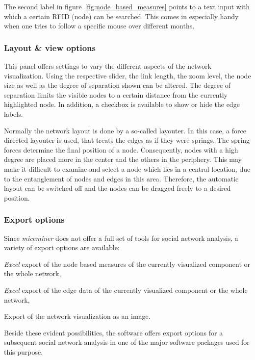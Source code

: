 The second label in figure~\ref{fig:node_based_measures} points to a text input with which a certain RFID (node) can be searched. This comes in especially handy when one tries to follow a specific mouse over different months.     

\subsubsection*{Layout \& view options}

This panel offers settings to vary the different aspects of the network visualization. Using the respective slider, the link length, the zoom level, the node size as well as the degree of separation shown can be altered. The degree of separation limits the visible nodes to a certain distance from the currently highlighted node. In addition, a checkbox is available to show or hide the edge labels.

Normally the network layout is done by a so-called layouter. In this case, a force directed layouter is used, that treats the edges as if they were springs. The spring forces determine the final position of a node. Consequently, nodes with a high degree are placed more in the center and the others in the periphery. This may make it difficult to examine and select a node which lies in a central location, due to the entanglement of nodes and edges in this area. Therefore, the automatic layout can be switched off and the nodes can be dragged freely to a desired position.

\subsubsection*{Export options} 
\label{subsubsec:export_options}

Since \textit{miceminer} does not offer a full set of tools for social network analysis, a variety of export options are available:

\begin{mylist}
\item \textit{Excel} export of the node based measures of the currently visualized component or the whole network,
\item \textit{Excel} export of the edge data of the currently visualized component or the whole network,
\item Export of the network visualization as an image.
\end{mylist}

Beside these evident possibilities, the software offers export options for a subsequent social network analysis in one of the major software packages used for this purpose.

